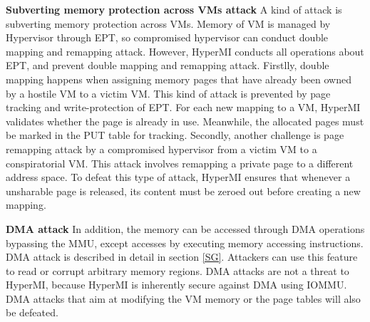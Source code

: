 \documentclass[conference]{IEEEtran}
\begin{document}

\textbf{Subverting memory protection across VMs attack}
A kind of attack is subverting memory protection across VMs. Memory of VM is managed by Hypervisor through EPT, so compromised hypervisor can conduct double mapping and remapping attack. However, HyperMI conducts all operations about EPT, and prevent double mapping and remapping attack.
Firstlly, double mapping happens when assigning memory pages that have already been owned by a hostile VM to a victim VM. This kind of attack is prevented by page tracking and write-protection of EPT. For each new mapping to a VM, HyperMI validates whether the page is already in use. Meanwhile, the allocated pages must be marked in the PUT table for tracking. Secondly, another challenge is page remapping attack by a compromised hypervisor from a victim VM to a conspiratorial VM. This attack involves remapping a private page to a different address space. To defeat this type of attack, HyperMI ensures that whenever a unsharable page is released, its content must be zeroed out before creating a new mapping.

\textbf{DMA attack}
In addition, the memory can be accessed through DMA operations bypassing the MMU, except accesses by executing memory accessing instructions. DMA attack is described in detail in section \ref{SG}. Attackers can use this feature to read or corrupt arbitrary memory regions. DMA attacks are not a threat to HyperMI, because HyperMI is inherently secure against DMA using IOMMU. DMA attacks that aim at modifying the VM memory or the page tables will also be defeated.
\end{document}
